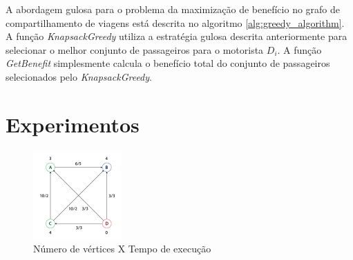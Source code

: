 \documentclass{article}
\begin{document}
A abordagem gulosa para o problema da maximização de benefício no grafo de compartilhamento de viagens está
descrita no algoritmo \ref{alg:greedy_algorithm}. A função \textit{KnapsackGreedy} utiliza a estratégia gulosa descrita anteriormente
para selecionar o melhor conjunto de passageiros para o motorista $ D_i $. A função \textit{GetBenefit} simplesmente
calcula o benefício total do conjunto de passageiros selecionados pelo \textit{KnapsackGreedy}.

\section{Experimentos}

\begin{figure}
  \center
  \includegraphics[width=128px]{graph.png}
  \caption{Número de vértices X Tempo de execução}
  \label{fig:execution_time}
\end{figure}
\end{document}
